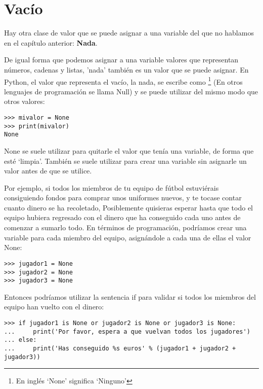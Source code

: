 \section{Vacío}

Hay otra clase de valor que se puede asignar a una variable del que no hablamos en el capítulo anterior:  \textbf{Nada}.
\par
De igual forma que podemos asignar a una variable valores que representan números, cadenas y listas, 'nada' también es un valor que se puede asignar.  En Python, el valor que representa el vacío, la nada, se escribe como \footnote{En inglés `None' significa `Ninguno'} (En otros lenguajes de programación se llama Null) y se puede utilizar del mismo modo que otros valores:

\begin{listing}
\begin{verbatim}
>>> mivalor = None
>>> print(mivalor)
None
\end{verbatim}
\end{listing}

None se suele utilizar para quitarle el valor que tenía una variable, de forma que esté `limpia'. También se suele utilizar para crear una variable sin asignarle un valor antes de que se utilice.
\par
Por ejemplo, si todos los miembros de tu equipo de fútbol estuviérais consiguiendo fondos para comprar unos uniformes nuevos, y te tocase contar cuanto dinero se ha recoletado, Posiblemente quisieras esperar hasta que todo el equipo hubiera regresado con el dinero que ha conseguido cada uno antes de comenzar a sumarlo todo.  En términos de programación, podríamos crear una variable para cada miembro del equipo, asignándole a cada una de ellas el valor None:

\begin{listing}
\begin{verbatim}
>>> jugador1 = None
>>> jugador2 = None
>>> jugador3 = None
\end{verbatim}
\end{listing}

Entonces podríamos utilizar la sentencia if para validar si todos los miembros del equipo han vuelto con el dinero:

\begin{listing}
\begin{verbatim}
>>> if jugador1 is None or jugador2 is None or jugador3 is None:
...     print('Por favor, espera a que vuelvan todos los jugadores')
... else:
...     print('Has conseguido %s euros' % (jugador1 + jugador2 + jugador3))
\end{verbatim}
\end{listing}

